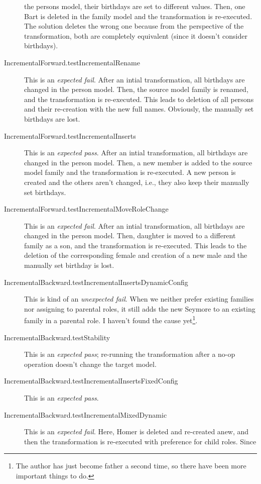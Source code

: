 \documentclass[a4paper]{article}
\begin{document}
\begin{description}
  the persons model, their birthdays are set to different values.  Then, one
  Bart is deleted in the family model and the transformation is re-executed.
  The solution deletes the wrong one because from the perspective of the
  transformation, both are completely equivalent (since it doesn't consider
  birthdays).
\item[IncrementalForward.testIncrementalRename] This is an \emph{expected
    fail}.  After an intial transformation, all birthdays are changed in the
  person model.  Then, the source model family is renamed, and the
  transformation is re-executed.  This leads to deletion of all persons and
  their re-creation with the new full names.  Obviously, the manually set
  birthdays are lost.
\item[IncrementalForward.testIncrementalInserts] This is an \emph{expected
    pass}.  After an intial transformation, all birthdays are changed in the
  person model.  Then, a new member is added to the source model family and the
  transformation is re-executed.  A new person is created and the others aren't
  changed, i.e., they also keep their manually set birthdays.
\item[IncrementalForward.testIncrementalMoveRoleChange] This is an
  \emph{expected fail}.  After an intial transformation, all birthdays are
  changed in the person model.  Then, daughter is moved to a different family
  as a son, and the transformation is re-executed.  This leads to the deletion
  of the corresponding female and creation of a new male and the manually set
  birthday is lost.
\item[IncrementalBackward.testIncrementalInsertsDynamicConfig] This is kind of
  an \emph{unexpected fail}.  When we neither prefer existing families nor
  assigning to parental roles, it still adds the new Seymore to an existing
  family in a parental role.  I haven't found the cause yet\footnote{The author
    has just become father a second time, so there have been more important
    things to do.}.
\item[IncrementalBackward.testStability] This is an \emph{expected pass};
  re-running the transformation after a no-op operation doesn't change the
  target model.
\item[IncrementalBackward.testIncrementalInsertsFixedConfig] This is an
  \emph{expected pass}.
\item[IncrementalBackward.testIncrementalMixedDynamic] This is an
  \emph{expected fail}.  Here, Homer is deleted and re-created anew, and then
  the transformation is re-executed with preference for child roles.  Since

\end{description}
\end{document}
